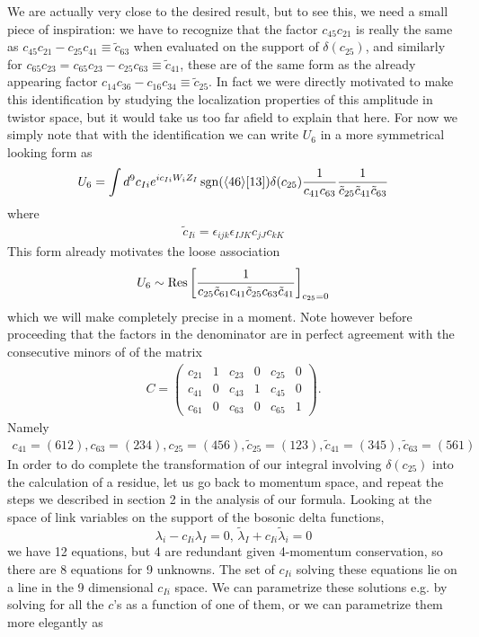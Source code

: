 \documentclass[12pt]{article}
\newcommand{\be}{\begin{eqnarray}}
\newcommand{\ee}{\end{eqnarray}}
\begin{document}
We are actually very close to the desired result, but to see this, we need a small piece of inspiration: we have to
recognize that the factor $c_{45} c_{21}$ is really the same as
$c_{45} c_{21} - c_{25} c_{41} \equiv \tilde c_{63}$ when  evaluated on the support of $\delta(c_{25})$,
and similarly for $c_{65} c_{23} = c_{65} c_{23} - c_{25} c_{63} \equiv \tilde c_{41}$, these are of the same form as the already appearing factor $c_{14} c_{36} - c_{16} c_{34} \equiv \tilde c_{25}$.
In fact we were directly motivated to make this identification by studying the localization properties of this amplitude in twistor space, but it would take us too far afield to explain that here. For now we simply note that with the identification we can write $U_6$ in a more symmetrical looking form as
\be
U_6 = \int d^9 c_{Ii} e^{i c_{Ii} W_i Z_I} \, {\rm sgn}(\langle 4 6 \rangle [13]) \delta(c_{25}) \frac{1}{c_{41} c_{63}} \frac{1}{\tilde c_{25} \tilde c_{41} \tilde c_{63}}
\ee
where
\be
\tilde c_{Ii} = \epsilon_{ijk} \epsilon_{IJK} c_{jJ} c_{kK}
\ee
This form already motivates the loose association
\be
U_6 \sim {\rm Res} \left[ \frac{1}{c_{25} \tilde c_{61} c_{41} \tilde c_{25} c_{63} \tilde c_{41}}\right]_{c_{25} = 0}
\ee
which we will make completely precise in a moment. Note however before proceeding that the factors in the denominator are in perfect agreement with the consecutive minors of of the matrix
\be \label{alter} C =
\left(\begin{array}{cccccc} c_{21} & 1 & c_{23} & 0 & c_{25} & 0 \\
c_{41} & 0 & c_{43} & 1 & c_{45} & 0 \\ c_{61} & 0 & c_{63} & 0 &
c_{65} & 1
\end{array}\right).
\ee
Namely
\be
\label{cmap}
c_{41} = (612), c_{63} = (234), c_{25} = (456), \tilde c_{25} = (123),  \tilde c_{41} = (345), \tilde c_{63} = (561)
\ee
In order to do complete the transformation of our integral involving $\delta(c_{25})$ into the calculation of a residue, let us go back to momentum space, and repeat the steps we described in section 2 in the analysis of our formula.
Looking at the space of link variables on the support of the bosonic delta functions,
\begin{equation}
\lambda_i - c_{Ii} \lambda_I = 0, \, \tilde \lambda_I + c_{Ii} \tilde \lambda_i = 0
\end{equation}
we have 12 equations, but 4 are redundant given 4-momentum conservation, so there are 8 equations for 9 unknowns. The set of $c_{Ii}$ solving these
equations lie on a line in the 9 dimensional $c_{Ii}$ space. We can parametrize these solutions e.g. by solving for all the $c$'s as a function of one of them, or we can parametrize them more elegantly as
\end{document}
